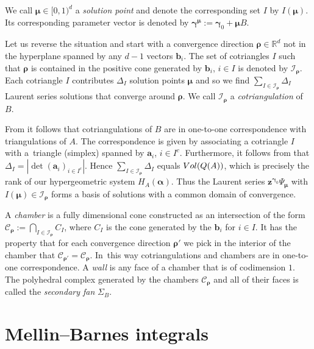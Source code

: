 \documentclass[11pt]{article}
\numberwithin{equation}{section}
\numberwithin{equation}{section}
\begin{document}
\begin{Definition}
We call $\bm\mu\in[0,1)^d$ a {\it solution point} and denote the corresponding set $I$ by $I(\bm\mu)$. Its corresponding parameter vector is denoted by $\bm{\gamma}^{\bm{\mu}} := \bm\gamma_0+\bm\mu B$.
\end{Definition}

Let us reverse the situation and start with a convergence direction $\bm\rho\in\mathbb{R}^d$
not in the hyperplane spanned by any $d-1$ vectors $\bm{b}_i$. The set of cotriangles
$I$ such that $\bm\rho$ is contained in the positive cone generated by $\bm{b}_i$, $i\in I$
is denoted by $\mathcal{I}_{\bm\rho}$. Each cotriangle $I$ contributes $\Delta_I$ solution
points $\bm\mu$ and so we find $\sum_{I\in\mathcal{I}_{\bm\rho}}\Delta_I$ Laurent series
solutions that converge around $\bm\rho$. We call $\mathcal{I}_{\bm\rho}$ a
{\it cotriangulation} of $B$.

From \cite[Section 5.4]{DRS10} it follows that cotriangulations of $B$ are
in one-to-one correspondence with triangulations of $A$. The correspondence is given
by associating a cotriangle $I$ with a~triangle (simplex) spanned by $\bm{a}_i$, $i\in I^c$.
Furthermore, it follows from \cite[Lemma 14.2]{Beu11} that $\Delta_I=|\det(\bm{a}_i)_{i\in I^c}|$.
Hence $\sum_{I\in\mathcal{I}_{\bm\rho}}\Delta_I$ equals ${\rm Vol}(Q(A))$, which is
precisely the rank of our hypergeometric system $H_A(\bm\alpha)$. Thus the Laurent
series $\bm{z}^{\bm\gamma_0}\Psi_{\bm\mu}$ with $I(\bm\mu)\in\mathcal{I}_{\bm\rho}$
forms a basis of solutions with a common domain of convergence.

\begin{Definition}
\label{def-chamber-wall-fan}
A {\it chamber} is a fully dimensional cone constructed as an intersection of the form $\mathcal{C}_{\bm\rho} := \bigcap_{I \in \mathcal{I}_{\bm\rho}} C_I$, where $C_I$ is the cone generated by the $\bm{b}_i$ for $i \in I$. It has the property that for each convergence direction $\bm\rho'$ we pick in the interior of the chamber that $\mathcal{C}_{\bm\rho'} = \mathcal{C}_{\bm\rho}$. In~this way cotriangulations and chambers are in one-to-one correspondence. A {\it wall} is any face of a chamber that is of codimension $1$. The polyhedral complex generated by the chambers $\mathcal{C}_{\bm\rho}$ and all of their faces is called the {\it secondary fan} $\Sigma_B$.
\end{Definition}

\section{Mellin--Barnes integrals}
\end{document}
